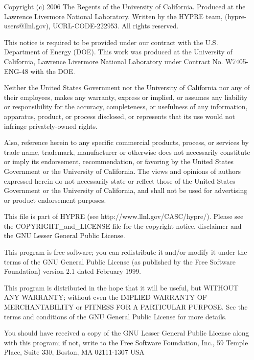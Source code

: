\noindent
Copyright (c) 2006   The Regents of the University of California.
Produced at the Lawrence Livermore National Laboratory.
Written by the HYPRE team, (hypre-users@llnl.gov), UCRL-CODE-222953.
All rights reserved.

\vspace{1em}\noindent
This notice is required to be provided under our contract with the U.S. 
Department of Energy (DOE). This work was produced at the University of 
California, Lawrence Livermore National Laboratory under Contract No. W7405-ENG-48 with the DOE.
 
\vspace{1em}\noindent
Neither the United States Government nor the University of California nor any 
of their employees, makes any warranty, express or implied, or assumes any 
liability or responsibility for the accuracy, completeness, or usefulness of any 
information, apparatus, product, or process disclosed, or represents that its use 
would not infringe privately-owned rights. 

\vspace{1em}\noindent
Also, reference herein to any specific commercial products, process, or 
services by trade name, trademark, manufacturer or otherwise does not 
necessarily constitute or imply its endorsement, recommendation, or favoring by 
the United States Government or the University of California. The views and 
opinions of authors expressed herein do not necessarily state or reflect those of 
the United States Government or the University of California, and shall not be 
used for advertising or product endorsement purposes. 

\vspace{1em}\noindent
This file is part of HYPRE (see http://www.llnl.gov/CASC/hypre/).
Please see the COPYRIGHT\_and\_LICENSE file for the copyright notice, 
disclaimer and the GNU Lesser General Public License.

\vspace{1em}\noindent
This program is free software; you can redistribute it and/or modify it
under the terms of the GNU General Public License (as published by the Free
Software Foundation) version 2.1 dated February 1999.
  
\vspace{1em}\noindent
This program is distributed in the hope that it will be useful, but WITHOUT
ANY WARRANTY; without even the IMPLIED WARRANTY OF MERCHANTABILITY or
FITNESS FOR A PARTICULAR PURPOSE.  See the terms and conditions of the
GNU General Public License for more details.

\vspace{1em}\noindent
You should have received a copy of the GNU Lesser General Public License
along with this program; if not, write to the Free Software Foundation,
Inc., 59 Temple Place, Suite 330, Boston, MA 02111-1307 USA
